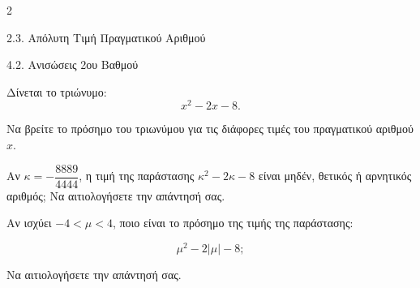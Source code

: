 \begin{ylh}{2}
    \item 2.3. Απόλυτη Τιμή Πραγματικού Αριθμού
    \item 4.2. Ανισώσεις 2ου Βαθμού
\end{ylh}
Δίνεται το τριώνυμο:
\begin{equation*}x^{2} - 2x - 8.\end{equation*}
\begin{alist}
\item Να βρείτε το πρόσημο του τριωνύμου για τις διάφορες τιμές του πραγματικού αριθμού $x$.
\item Αν $\kappa = - \dfrac{8889}{4444}$, η τιμή της παράστασης $\kappa^{2} - 2\kappa - 8$ είναι μηδέν, θετικός ή αρνητικός αριθμός; Να αιτιολογήσετε την απάντησή σας.
\item Αν ισχύει $- 4 < \mu < 4$, ποιο είναι το πρόσημο της τιμής της παράστασης:

\begin{equation*}\mu^{2} - 2|\mu| - 8;\end{equation*}

Να αιτιολογήσετε την απάντησή σας.
\end{alist}

